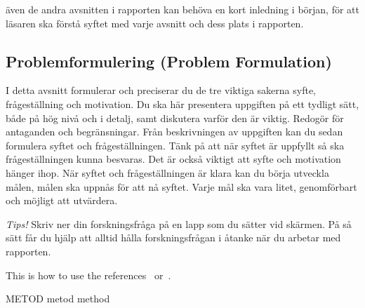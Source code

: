 även de andra avsnitten i rapporten kan behöva en kort inledning i början, för att läsaren ska förstå syftet med varje avsnitt och dess plats i rapporten.


\subsection{Problemformulering (Problem Formulation)} 

I detta avsnitt formulerar och preciserar du de tre viktiga sakerna syfte, frågeställning och motivation. Du ska här presentera uppgiften på ett tydligt sätt, både på hög nivå och i detalj, samt diskutera varför den är viktig. Redogör för antaganden och begränsningar. Från beskrivningen av uppgiften kan du sedan formulera syftet och frågeställningen. Tänk på att när syftet är uppfyllt så ska frågeställningen kunna besvaras. Det är också viktigt att syfte och motivation hänger ihop. När syftet och frågeställningen är klara kan du börja utveckla målen, målen ska uppnås för att nå syftet. Varje mål ska vara litet, genomförbart och möjligt att utvärdera.  


\emph{Tips!} Skriv ner din forskningsfråga på en lapp som du sätter vid skärmen. På så sätt får du hjälp att alltid hålla forskningsfrågan i åtanke när du arbetar med rapporten.

This is how to use the references~\cite{Berndtsson607210, Blomkvist2014} or~\cite{Turing1950}.

METOD metod method




